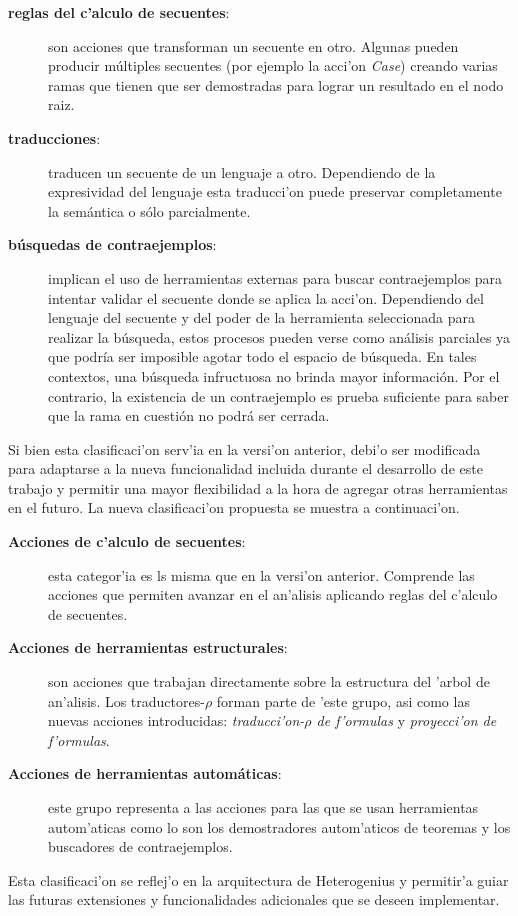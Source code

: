 \begin{description}
\label{clasificacion}
\item[\textbf{reglas del c'alculo de secuentes}:] son acciones que transforman un secuente en otro. Algunas pueden producir múltiples secuentes (por ejemplo la acci'on \emph{Case}) creando varias ramas que tienen que ser demostradas para lograr un resultado en el nodo raiz.

\item[\textbf{traducciones}:] traducen un secuente de un lenguaje a otro. Dependiendo de la expresividad del lenguaje esta traducci'on puede preservar completamente la semántica o sólo parcialmente.

\item[\textbf{búsquedas de contraejemplos}:] implican el uso de herramientas externas para buscar contraejemplos para intentar validar el secuente donde se aplica la acci'on. 
Dependiendo del lenguaje del secuente y del poder de la herramienta seleccionada para realizar la búsqueda, estos procesos pueden verse como análisis parciales ya que podría ser imposible agotar todo el espacio de búsqueda. En tales contextos, una búsqueda infructuosa no brinda mayor información. Por el contrario, la existencia de un contraejemplo es prueba suficiente para saber que la rama en cuestión no podrá ser cerrada.
\end{description}

Si bien esta clasificaci'on serv'ia en la versi'on anterior, debi'o ser modificada para adaptarse a la nueva funcionalidad incluida durante el desarrollo de este trabajo y permitir una mayor flexibilidad a la hora de agregar otras herramientas en el futuro.
La nueva clasificaci'on propuesta se muestra a continuaci'on.

\begin{description}
\item[\textbf{Acciones de c'alculo de secuentes}:] esta categor'ia es ls misma que en la versi'on anterior. Comprende las acciones que permiten avanzar en el an'alisis aplicando reglas del c'alculo de secuentes.

\item[\textbf{Acciones de herramientas estructurales}:] son acciones que trabajan directamente sobre la estructura del 'arbol de an'alisis. Los traductores-$\rho$ forman parte de 'este grupo, asi como las nuevas acciones introducidas: \textit{traducci'on-$\rho$ de f'ormulas} y \textit{proyecci'on de f'ormulas}.

\item[\textbf{Acciones de herramientas automáticas}:] este grupo representa a las acciones para las que se usan herramientas autom'aticas como lo son los demostradores autom'aticos de teoremas y los buscadores de contraejemplos.
\end{description}

Esta clasificaci'on se reflej'o en la arquitectura de Heterogenius y permitir'a guiar las futuras extensiones y funcionalidades adicionales que se deseen implementar.
